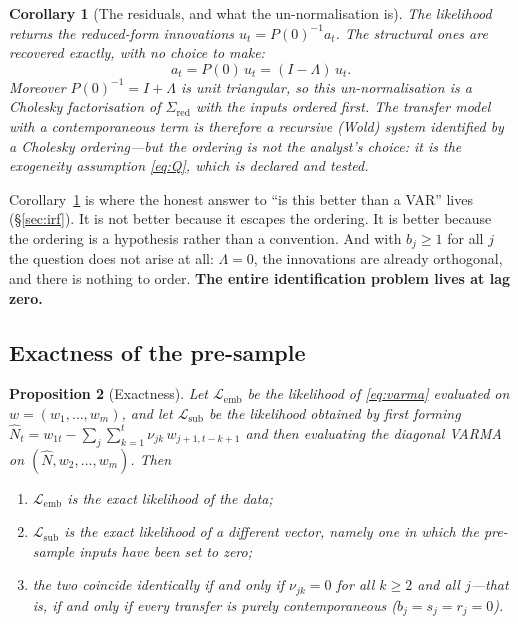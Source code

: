 \documentclass[11pt,a4paper]{article}
\theoremstyle{plain}
\newtheorem{proposition}{Proposition}
\newtheorem{corollary}[proposition]{Corollary}
\theoremstyle{remark}
\begin{document}
\begin{corollary}[The residuals, and what the un-normalisation is]
\label{cor:chol}
The likelihood returns the reduced-form innovations $u_t = P(0)^{-1}a_t$. The
structural ones are recovered exactly, with no choice to make:
\begin{equation}
a_t = P(0)\,u_t = (I-\Lambda)\,u_t .
\end{equation}
Moreover $P(0)^{-1}=I+\Lambda$ is unit triangular, so \emph{this un-normalisation is
a Cholesky factorisation of $\Sigma_{\mathrm{red}}$ with the inputs ordered first.}
The transfer model with a contemporaneous term is therefore a recursive (Wold) system
identified by a Cholesky ordering---but the ordering is not the analyst's choice: it
is the exogeneity assumption \eqref{eq:Q}, which is declared and \emph{tested}.
\end{corollary}

Corollary~\ref{cor:chol} is where the honest answer to ``is this better than a VAR''
lives (\S\ref{sec:irf}). It is not better because it escapes the ordering. It is
better because the ordering is a hypothesis rather than a convention. And with
$b_j\ge1$ for all $j$ the question does not arise at all: $\Lambda=0$, the
innovations are already orthogonal, and there is nothing to order. \textbf{The entire
identification problem lives at lag zero.}

\subsection{Exactness of the pre-sample}

\begin{proposition}[Exactness]
\label{prop:exact}
Let $\mathcal{L}_{\mathrm{emb}}$ be the likelihood of \eqref{eq:varma} evaluated on
$w=(w_1,\dots,w_m)$, and let $\mathcal{L}_{\mathrm{sub}}$ be the likelihood obtained
by first forming $\hat N_t = w_{1t}-\sum_j\sum_{k=1}^{t}\nu_{jk}\,w_{j+1,t-k+1}$ and
then evaluating the diagonal VARMA on $(\hat N,w_2,\dots,w_m)$. Then
\begin{enumerate}
\item $\mathcal{L}_{\mathrm{emb}}$ is the exact likelihood of the data;
\item $\mathcal{L}_{\mathrm{sub}}$ is the exact likelihood of a \emph{different}
      vector, namely one in which the pre-sample inputs have been set to zero;
\item the two coincide identically if and only if $\nu_{jk}=0$ for all $k\ge2$ and
      all $j$---that is, if and only if every transfer is purely contemporaneous
      ($b_j=s_j=r_j=0$).
\end{enumerate}
\end{proposition}
\end{document}
